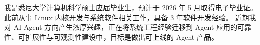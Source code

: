 

\begin{cvparagraph}

我是悉尼大学计算机科学硕士应届毕业生，预计于 2026 年 5 月取得电子毕业证。
此前从事 Linux 内核开发与系统软件相关工作，具备 3 年软件开发经验。
近期我对 AI Agent 方向产生浓厚兴趣，正在将系统工程经验迁移到 Agent 应用的可靠性、可扩展性与可观测性建设中，目标是做出可上线的 Agent 产品。

\end{cvparagraph}
